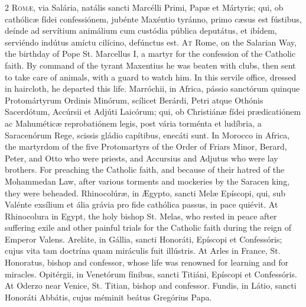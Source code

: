 \begin{paracol}{2}
\lettrine[lines=2]{R}{omæ,} via Salária, natális sancti Marcélli 
 Primi, Papæ et Mártyris; qui, ob cathólicæ fídei confessiónem, jubénte 
 Maxéntio tyránno, primo cæsus est fústibus, deínde ad servítium animálium 
 cum custódia pública deputátus, et ibídem, serviéndo indútus amíctu cilícino, 
 defúnctus est.
\switchcolumn
{}
\lettrine[lines=2]{A}{t} Rome, on the Salarian Way, the birthday of Pope St. Marcellus I, a martyr 
 for the confession of the Catholic faith. By command of the tyrant 
 Maxentius he was beaten with clubs, then sent to take care of animals, with 
 a guard to watch him. In this servile office, dressed in haircloth, he 
 departed this life.
\switchcolumn*
{}
Marróchii, in Africa, pássio sanctórum quinque Protomártyrum Ordinis Minórum, 
 scílicet Berárdi, Petri atque Othónis Sacerdótum, Accúrsii et Adjúti 
 Laicórum; qui, ob Christiánæ fídei 
 prædicatiónem ac Mahuméticæ reprobatiónem legis, post vária torménta et 
 ludíbria, a Saracenórum Rege, scissis gládio capítibus, enecáti sunt.
\switchcolumn
{}
In Morocco in Africa, the martyrdom of the five Protomartyrs of the Order of 
 Friars Minor, Berard, Peter, and Otto who were priests, and Accursius and 
 Adjutus who were lay brothers. For preaching the Catholic faith, and 
 because of their hatred of the Mohammedan Law, after various torments and 
 mockeries by the Saracen king, they were beheaded.
\switchcolumn*
{}
Rhinocolúræ, in Ægypto, sancti Melæ Epíscopi, 
 qui, sub Valénte exsílium et ália grávia pro fide cathólica passus, in pace 
 quiévit.
\switchcolumn
{}
At Rhinocolura in Egypt, the holy bishop St. Melas, who rested in peace 
 after suffering exile and other painful trials for the Catholic faith during 
 the reign of Emperor Valens.
\switchcolumn*
{}
Areláte, in Gállia, sancti Honoráti, Epíscopi et Confessóris; cujus vita tam 
 doctrína quam miráculis fuit illústris.
\switchcolumn
{}
At Arles in France, St. Honoratus, bishop and confessor, whose life was 
 renowned for learning and for miracles.
\switchcolumn*
{}
Opitérgii, in Venetórum fínibus, sancti Titiáni, Epíscopi et Confessóris.
\switchcolumn
{}
At Oderzo near Venice, St. Titian, bishop and confessor.
\switchcolumn*
{}
Fundis, in Látio, sancti Honoráti Abbátis, cujus méminit beátus Gregórius 
 Papa.
\switchcolumn
{}

\end{paracol}
